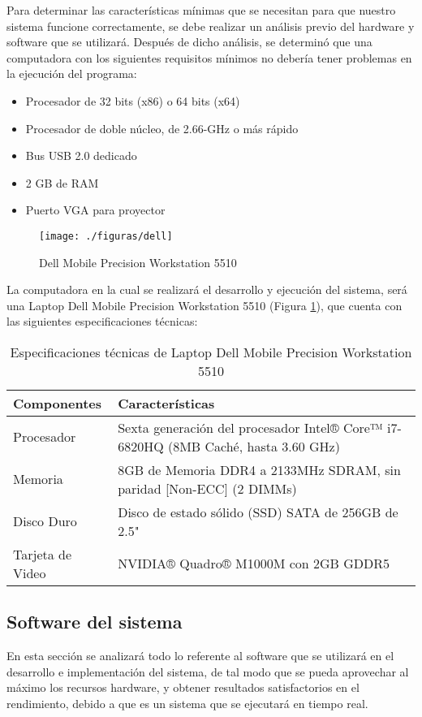 \documentclass[a4paper,openright,12pt]{report}
\begin{document}
Para determinar las características mínimas que se necesitan para que nuestro sistema funcione correctamente, se debe realizar un análisis previo del hardware y software que se utilizará. Después de dicho análisis, se determinó que una computadora con los siguientes requisitos mínimos no debería tener problemas en la ejecución del programa:
\begin{itemize}
	\item Procesador de 32 bits (x86) o 64 bits (x64)
	\item Procesador de doble núcleo, de 2.66-GHz o más rápido
	\item Bus USB 2.0 dedicado
	\item 2 GB de RAM
	\item Puerto VGA para proyector
\end{itemize}
\begin{figure}[htb]
	\centering
	\texttt{[image: ./figuras/dell]}
	\caption{Dell Mobile Precision Workstation 5510}\label{fig:dell}
\end{figure}
La computadora en la cual se realizará el desarrollo y ejecución del sistema, será una Laptop Dell Mobile Precision Workstation 5510 (Figura \ref{fig:dell}), que cuenta con las siguientes especificaciones técnicas: 
\begin{table}[H]
	\centering
	\begin{tabular}{>{\arraybackslash}m{4cm} >{ \arraybackslash}m{9cm} }
		\hline
		Componentes & Características\\
		\hline \hline
		Procesador
		&
		Sexta generación del procesador Intel® Core™ i7-6820HQ (8MB Caché, hasta 3.60 GHz)
		\\
		\hline
		Memoria & 
		8GB de Memoria DDR4 a 2133MHz SDRAM, sin paridad [Non-ECC] (2 DIMMs)
		\\
		\hline
		Disco Duro &
		Disco de estado sólido (SSD) SATA de 256GB de 2.5"\\
		\hline
		Tarjeta de Video &
		NVIDIA® Quadro® M1000M con 2GB GDDR5\\
		\hline
	\end{tabular}
	\caption{Especificaciones técnicas de Laptop Dell Mobile Precision Workstation 5510}
	\label{tabla:especDell}
\end{table}
\subsection{Software del sistema}
En esta sección se analizará todo lo referente al software que se utilizará en el desarrollo e implementación del sistema, de tal modo que se pueda aprovechar al máximo los recursos hardware, y obtener resultados satisfactorios en el rendimiento, debido a que es un sistema que se ejecutará en tiempo real.
\end{document}
